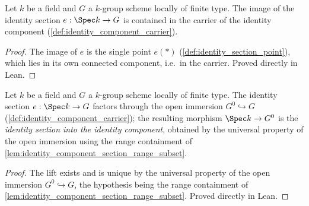 \begin{lemma}

  \label{lem:identity_component_section_range_subset}
  Let \(k\) be a field and \(G\) a \(k\)-group scheme locally of finite
  type. The image of the identity section \(e : \Spec k \to G\) is
  contained in the carrier of the identity component
  (\cref{def:identity_component_carrier}).
\end{lemma}
\begin{proof}
  The image of \(e\) is the single point \(e(\ast)\)
  (\cref{def:identity_section_point}), which lies in its own connected
  component, i.e.\ in the carrier. Proved directly in Lean.
\end{proof}

\begin{definition}

  \label{def:identity_component_section}
  Let \(k\) be a field and \(G\) a \(k\)-group scheme locally of finite
  type. The identity section \(e : \Spec k \to G\) factors through the
  open immersion \(G^0 \hookrightarrow G\)
  (\cref{def:identity_component_carrier}); the resulting morphism
  \(\Spec k \to G^0\) is the \emph{identity section into the identity
  component}, obtained by the universal property of the open immersion
  using the range containment of
  \cref{lem:identity_component_section_range_subset}.
\end{definition}
\begin{proof}
  The lift exists and is unique by the universal property of the open
  immersion \(G^0 \hookrightarrow G\), the hypothesis being the range
  containment of \cref{lem:identity_component_section_range_subset}.
  Proved directly in Lean.
\end{proof}

